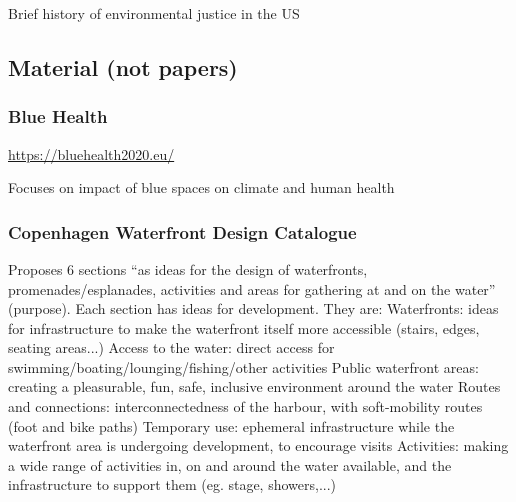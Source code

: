 \documentclass{article}
\begin{document}
\subsubsection{}

\begin{outline}
	\1 Brief history of environmental justice in the US
\end{outline}


\subsection{Material (not papers)}

\subsubsection{Blue Health}

\url{https://bluehealth2020.eu/}

\begin{outline}
	\1 Focuses on impact of blue spaces on climate and human health
\end{outline}

\subsubsection{Copenhagen Waterfront Design Catalogue}

\parencite{copenhagenwaterfront}

\begin{outline}
	\1 Proposes 6 sections ``as ideas for the design of waterfronts, promenades/esplanades, activities and areas for gathering at and on the water'' (purpose). Each section has ideas for development. They are:
		\2 Waterfronts: ideas for infrastructure to make the waterfront itself more accessible (stairs, edges, seating areas...)
		\2 Access to the water: direct access for swimming/boating/lounging/fishing/other activities
		\2 Public waterfront areas: creating a pleasurable, fun, safe, inclusive environment around the water
		\2 Routes and connections: interconnectedness of the harbour, with soft-mobility routes (foot and bike paths)
		\2 Temporary use: ephemeral infrastructure while the waterfront area is undergoing development, to encourage visits
		\2 Activities: making a wide range of activities in, on and around the water available, and the infrastructure to support them (eg. stage, showers,...)
\end{outline}
\end{document}
